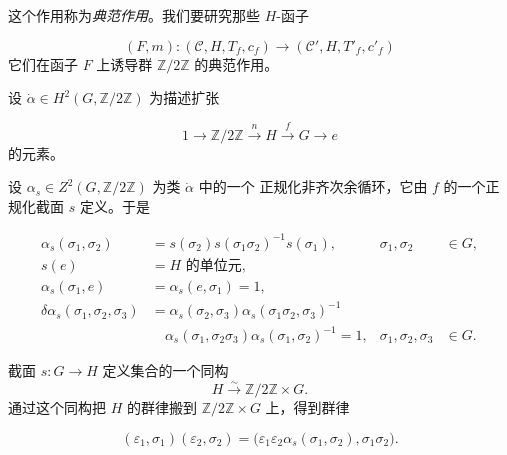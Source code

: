 \clearpage
{}%
这个作用称为\emph{典范作用}。我们要研究那些 $H$-函子

\begin{equation}
  (F,m)\colon(\mathcal C,H,T_f,c_f)
  \longrightarrow(\mathcal C',H,T'_f,c'_f)
  \tag{1.4.3.3}
\end{equation}
它们在函子 $F$ 上诱导群 $\mathbb Z/2\mathbb Z$ 的典范作用。

设 $\dot\alpha\in H^2(G,\mathbb Z/2\mathbb Z)$ 为描述扩张

\begin{equation}
  1\longrightarrow\mathbb Z/2\mathbb Z
  \xrightarrow{n}H\xrightarrow{f}G\longrightarrow e
  \tag{1.4.3.4}
\end{equation}
的元素。

设 $\alpha_s\in Z^2(G,\mathbb Z/2\mathbb Z)$ 为类 $\dot\alpha$ 中的一个
正规化非齐次余循环，它由 $f$ 的一个正规化截面 $s$ 定义。于是

\begin{equation}
  \begin{aligned}
    \alpha_s(\sigma_1,\sigma_2)
      &=s(\sigma_2)s(\sigma_1\sigma_2)^{-1}s(\sigma_1),
      & \sigma_1,\sigma_2&\in G,\\
    s(e)&=H\text{ 的单位元},\\
    \alpha_s(\sigma_1,e)&=\alpha_s(e,\sigma_1)=1,\\
    \delta\alpha_s(\sigma_1,\sigma_2,\sigma_3)
      &=\alpha_s(\sigma_2,\sigma_3)
        \alpha_s(\sigma_1\sigma_2,\sigma_3)^{-1}\\
      &\quad{}\alpha_s(\sigma_1,\sigma_2\sigma_3)
        \alpha_s(\sigma_1,\sigma_2)^{-1}=1,
      & \sigma_1,\sigma_2,\sigma_3&\in G.
  \end{aligned}
  \tag{1.4.3.5}
\end{equation}

截面 $s\colon G\to H$ 定义集合的一个同构
\[
  H\xrightarrow{\sim}\mathbb Z/2\mathbb Z\times G.
\]
通过这个同构把 $H$ 的群律搬到 $\mathbb Z/2\mathbb Z\times G$ 上，得到群律

\begin{equation}
  (\varepsilon_1,\sigma_1)(\varepsilon_2,\sigma_2)
  =\bigl(\varepsilon_1\varepsilon_2
    \alpha_s(\sigma_1,\sigma_2),\sigma_1\sigma_2\bigr).
  \tag{1.4.3.6}
\end{equation}

